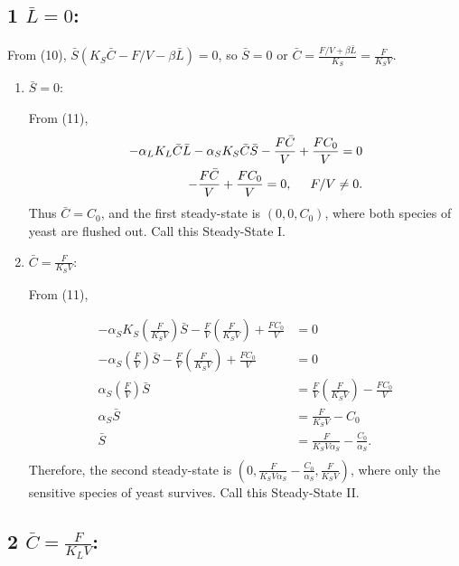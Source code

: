 \subsection*{1  $\bar{L} = 0$:}

  From (10), $\bar{S}(K_S \bar{C} - F/V - \beta \bar{L}) = 0$, so $\bar{S} = 0$ or $\bar{C} = \frac{F/V + \beta \bar{L}}{K_S} = \frac{F}{K_S V}$.
  
  \begin{enumerate}

    \item $\bar{S} = 0$:
      
    From (11), 
    \begin{align*}
      -\alpha_L K_L \bar{C}\bar{L} -\alpha_S K_S \bar{C}\bar{S} - \frac{F\bar{C}}{V} + \frac{FC_0}{V} = 0 \\
      -\frac{F\bar{C}}{V} + \frac{FC_0}{V} = 0, \hspace{5mm} F/V \neq 0.
    \end{align*}
    Thus $\bar{C} = C_0$, and the first steady-state is {\color{red}$(0,0,C_0)$}, where both species of yeast are flushed out.  Call this {\color{red}Steady-State I}.

    \item $\bar{C} = \frac{F}{K_S V}$:

    From (11), 
    
    \begin{align*}
      -\alpha_S K_S \left( \frac{F}{K_S V} \right) \bar{S} - \frac{F}{V} \left( \frac{F}{K_S V} \right) + \frac{FC_0}{V} &= 0 \\
      -\alpha_S \left( \frac{F}{V} \right) \bar{S} - \frac{F}{V} \left( \frac{F}{K_S V} \right) + \frac{FC_0}{V} &= 0 \\
      \alpha_S \left( \frac{F}{V} \right) \bar{S} &= \frac{F}{V} \left( \frac{F}{K_S V} \right) - \frac{FC_0}{V} \\
      \alpha_S \bar{S} &= \frac{F}{K_S V} - C_0 \\
      \bar{S} &= \frac{F}{K_S V \alpha_S} - \frac{C_0}{\alpha_S}. \\
    \end{align*}
    Therefore, the second steady-state is {\color{red}$\left(0, \frac{F}{K_S V \alpha_S} - \frac{C_0}{\alpha_S}, \frac{F}{K_S V} \right)$}, where only the sensitive species of yeast survives.  Call this {\color{red}Steady-State II}. 
  \end{enumerate}

\subsection*{2  $\bar{C} = \frac{F}{K_L V}$:}

